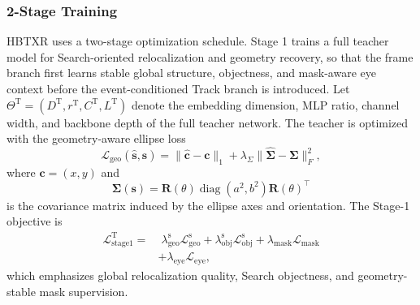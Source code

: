 \documentclass[journal]{IEEEtran}
\begin{document}
\subsubsection{2-Stage Training}
HBTXR uses a two-stage optimization schedule. Stage 1 trains a full teacher model for Search-oriented relocalization and geometry recovery, so that the frame branch first learns stable global structure, objectness, and mask-aware eye context before the event-conditioned Track branch is introduced. Let $\Theta^{\mathrm{T}}=(D^{\mathrm{T}}, r^{\mathrm{T}}, C^{\mathrm{T}}, L^{\mathrm{T}})$ denote the embedding dimension, MLP ratio, channel width, and backbone depth of the full teacher network. The teacher is optimized with the geometry-aware ellipse loss
\begin{equation}
\mathcal L_{\mathrm{geo}}(\hat{\mathbf s},\mathbf s)=
\|\hat{\mathbf c}-\mathbf c\|_1 + \lambda_{\Sigma}\|\hat{\bm\Sigma}-\bm\Sigma\|_F^2,
\end{equation}
where $\mathbf c=(x,y)$ and
\begin{equation}
\bm\Sigma(\mathbf s)=
\mathbf R(\theta)\operatorname{diag}(a^2,b^2)\mathbf R(\theta)^{\top}
\end{equation}
is the covariance matrix induced by the ellipse axes and orientation. The Stage-1 objective is
\begin{align}
\mathcal L_{\mathrm{stage1}}^{\mathrm{T}} =
&\;\lambda_{\mathrm{geo}}^{\mathrm{s}}\mathcal L_{\mathrm{geo}}^{\mathrm{s}}
+ \lambda_{\mathrm{obj}}^{\mathrm{s}}\mathcal L_{\mathrm{obj}}^{\mathrm{s}}
+ \lambda_{\mathrm{mask}}\mathcal L_{\mathrm{mask}}
\nonumber\\
&+ \lambda_{\mathrm{eye}}\mathcal L_{\mathrm{eye}},
\end{align}
which emphasizes global relocalization quality, Search objectness, and geometry-stable mask supervision.
\end{document}
